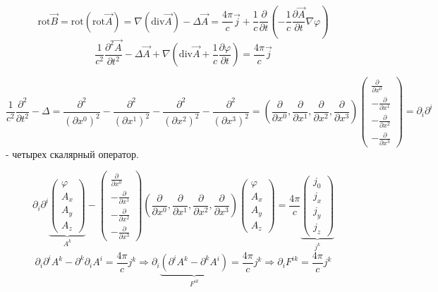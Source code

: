\documentclass[12pt, a4paper]{report}
\begin{document}
\[ \mathrm{rot }  \vec{B }  = \mathrm{rot }  (\mathrm{rot } \vec{A }  ) = \nabla (\mathrm{ div } \vec{A }   ) - \Delta \vec{ A }  = \frac{4\pi}{c }  \vec{ j}  +\frac{1}{c }  \frac{\partial  }{\partial  t } \left( -\frac{1}{c }  \frac{\partial  \vec{ A } }{\partial  t } \nabla \varphi   \right)   \] 
\[ \boxed{\frac{1}{c ^2 } \frac{\partial   ^2 \vec{ A } }{\partial  t ^2 } - \Delta \vec{A }  + \nabla \left( \mathrm{ div } \vec{A }  + \frac{1}{c }  \frac{\partial  \varphi }{\partial  t }    \right)   = \frac{4\pi}{c }  \vec{ j}} \] 

\[ \frac{1}{c ^2 } \frac{\partial  ^2 }{\partial  t ^2 } - \Delta = \frac{\partial  ^2 }{( \partial  x ^0 ) ^2 } - \frac{\partial  ^2 }{(\partial  x ^1 ) ^2 } - \frac{\partial  ^2  }{( \partial  x^2) ^2 } - \frac{\partial ^2 }{( \partial  x ^3 ) ^2 } = \left( \frac{\partial  }{ \partial  x ^0 }, \frac{\partial}{ \partial  x ^1 } , \frac{\partial  }{\partial  x^2 } , \frac{\partial  }{\partial  x^3 }     \right)   \begin{pmatrix}
\frac{\partial  }{\partial  x ^0 } \\[5pt]
-\frac{\partial  }{\partial  x^1} \\[5pt]
-\frac{\partial  }{\partial  x^2} \\[5pt]
-\frac{\partial  }{\partial  x^3} 
\end{pmatrix}  = \partial_i \partial ^{i}   \] 
- четырех скалярный оператор.

\[ \partial _i \partial ^i 
\underbrace{\begin{pmatrix}
    \varphi\\
    A_x\\
    A_y\\
    A_z
\end{pmatrix}}_{A^k}
-
\begin{pmatrix}
    \frac{\partial  }{\partial  x ^0 } \\[5pt]
    -\frac{\partial  }{\partial  x^1} \\[5pt]
    -\frac{\partial  }{\partial  x^2} \\[5pt]
    -\frac{\partial  }{\partial  x^3} 
\end{pmatrix} 
\left( \frac{\partial  }{ \partial  x ^0 }, \frac{\partial}{ \partial  x ^1 } , \frac{\partial  }{\partial  x^2 } , \frac{\partial  }{\partial  x^3 }     \right)
\begin{pmatrix}
        \varphi\\
        A_x\\
        A_y\\
        A_z
\end{pmatrix} = \frac{4\pi}{c }  
\underbrace{\begin{pmatrix}
    j_0\\
    j_x\\
    j_y\\
    j_z
\end{pmatrix} }_{j^k} \] 
\[ \partial_i \partial ^i A^k - \partial ^k \partial_i A^i = \frac{4 \pi}{c} j^k \Rightarrow \partial _i \underbrace{(\partial  ^i A ^k - \partial ^k A^i )}_{F^{ik } } = \frac{4\pi}{c }   j^k \Rightarrow \partial _i F^{ik }  = \frac{4\pi}{c }  j^k  \tag{\(*  \) }\]  \\
\end{document}
